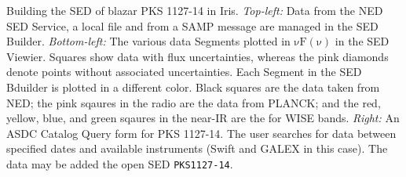 \textbf{\textit{\label{fig:load_data}} } Building the SED of blazar PKS 1127-14 in Iris. \textit{Top-left:} Data from the NED SED Service, a local file and from a SAMP message are managed in the SED Builder. \textit{Bottom-left:} The various data Segments plotted in $\mathrm{\nu F \left( \nu \right)}$ in the SED Viewier. Squares show data with flux uncertainties, whereas the pink diamonds denote points without associated uncertainties. Each Segment in the SED Bduilder is plotted in a different color. Black squares are the data taken from NED; the pink sqaures in the radio are the data from PLANCK; and the red, yellow, blue, and green sqaures in the near-IR are the for WISE bands. \textit{Right:} An ASDC Catalog Query form for PKS 1127-14. The user searches for data between specified dates and available instruments (Swift and GALEX in this case). The data may be added the open SED \texttt{PKS1127-14}.